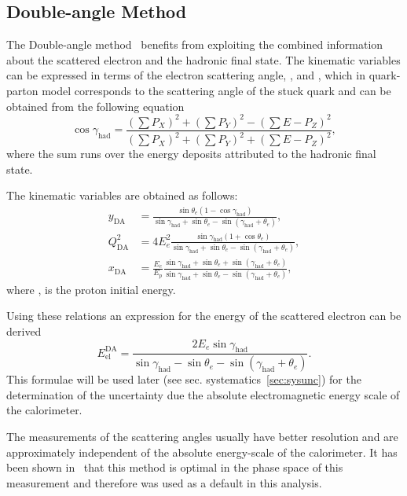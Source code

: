 \subsection{Double-angle Method}
\label{subsec:da}
The Double-angle method~\cite{proc:hera:1991:23} benefits from exploiting the combined information about the scattered electron and the hadronic final state. The kinematic variables can be expressed in terms of the electron scattering angle, \thetae, and \gamha, which in quark-parton model corresponds to the scattering angle of the stuck quark and can be obtained from the following equation
\begin{equation}
\cos \gamma_{\text{had}} = \frac{ \left( \sum{P_{X}} \right)^2 + \left( \sum{P_{Y}} \right)^2 - (\sum{E - P_{Z}})^2 }{\left( \sum{P_{X}} \right)^2 + \left( \sum{P_{Y}} \right)^2 + (\sum{E - P_{Z}})^2},
\label{eq:cosgam}
\end{equation}
where the sum runs over the energy deposits attributed to the hadronic final state.

The kinematic variables are obtained as follows:
\begin{align}
	y_\text{DA}      &= \frac{ \sin \theta_e \left( 1 - \cos \gamma_\text{had} \right)}{ \sin \gamma_\text{had} + \sin \theta_e - \sin \left( \gamma_\text{had} + \theta_e \right) },			\label{eq:yda} \\
	Q^2_\text{DA} &= 4E_e^2\frac{ \sin \gamma_\text{had} \left( 1 + \cos \theta_e \right) }{ \sin \gamma_\text{had} + \sin \theta_e - \sin \left( \gamma_\text{had} + \theta_e \right) },			\label{eq:q2da}							\\
	x_\text{DA}      &= \frac{E_e}{E_p} \frac{\sin \gamma_\text{had} + \sin \theta_e + \sin \left( \gamma_\text{had} + \theta_e \right)}{\sin \gamma_\text{had} + \sin \theta_e - \sin \left( \gamma_\text{had} + \theta_e \right)},			\label{eq:xda}
\end{align}
where \epini, is the proton initial energy.

Using these relations an expression for the energy of the scattered electron can be derived
\begin{equation}
E_\text{el}^\text{DA} = \frac{2E_e \sin \gamma_\text{had}}{\sin \gamma_\text{had} - \sin \theta_e - \sin \left( \gamma_\text{had} + \theta_e \right)}.
\label{eq:eeda}
\end{equation}
This formulae will be used later (see sec. systematics~\ref{sec:sysunc}) for the determination of the uncertainty due the absolute electromagnetic energy scale of the calorimeter.

 The measurements of the scattering angles usually have better resolution and are approximately independent of the absolute energy-scale of the calorimeter. It has been shown in~\cite{thesis:behr:2010} that this method is optimal in the phase space of this measurement and therefore was used as a default in this analysis.

